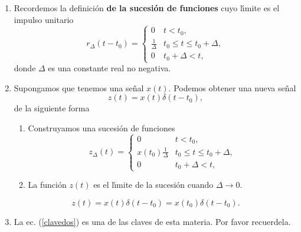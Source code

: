 \begin{enumerate}
\item Recordemos la definici\'{o}n \textbf{de la sucesi\'{o}n de
    funciones} cuyo l\'{\i}mite es el impulso unitario
  \begin{equation}
    r_{\Delta} \left( t - t_{0} \right) = \left \{
      \begin{array}{ll}
        0                       &       t < t_{0},                                              \\
        \frac{1}{\Delta}        &       t_{0} \leq      t       \leq    t_{0} + \Delta,         \\
        0                       &       t_{0} + \Delta < t ,
      \end{array} 
    \right.
  \end{equation}
  donde $\Delta$ es una constante real no negativa.

\item Supongamos que tenemos una se\~{n}al $x \left( t \right)$.
  Podemos obtener una nueva se\~{n}al
  \begin{equation}
    z \left( t \right) = x \left( t \right) \delta \left( t - t_{0}\right),
  \end{equation}
  de la siguiente forma
  \begin{enumerate}
  \item Construyamos una sucesi\'{o}n de funciones
    \begin{equation}
      z_{\Delta} \left( t \right) = \left \{
        \begin{array}{ll}
          0                                       &       t < t_{0},                              \\
          x\left( t_{0} \right) \frac{1}{\Delta}      &       t_{0} \leq t \leq t_{0} + \Delta,       \\
          0                                       &       t_{0} + \Delta < t,
        \end{array} 
      \right.
    \end{equation}
                        
  \item La funci\'{o}n $z \left( t \right)$ es el l\'{\i}mite de la
    sucesi\'{o}n cuando $\Delta \rightarrow 0$.
                        
  \end{enumerate}
  \begin{equation}
    z \left( t \right) = 
    x\left( t\right) \delta \left( t-t_{0}\right) =
    x\left( t_{0}\right) \delta \left(
      t-t_{0}\right) . \label{clavedos}
  \end{equation}

\item La ec. (\ref{clavedos}) es una de las claves de esta materia.
  Por favor recuerdela.
\end{enumerate}

